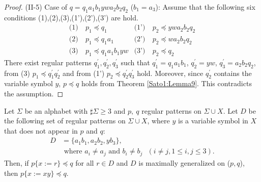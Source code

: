 \begin{proof}
\noindent
(II-5) Case of $q=q_{1}a_{1}b_{1}ywa_{2}b_{2}q_{2}$ ($b_{1}=a_{3}$):
Assume that the following six conditions (1),(2),(3),(1'),(2'),(3') are hold.
\begin{align*}
\textrm{(1)}~& p_{1} \preceq q_{1} & \textrm{(1')}~& p_{2} \preceq ywa_{2}b_{2}q_{2} \\
\textrm{(2)}~& p_{1} \preceq q_{1}a_{1} & \textrm{(2')}~& p_{2} \preceq wa_{2}b_{2}q_{2} \\
\textrm{(3)}~& p_{1} \preceq q_{1}a_{1}b_{1}yw & \textrm{(3')}~& p_{2} \preceq q_{2}
\end{align*}
\noindent
There exist regular patterns $q_{1}^{\prime}, q_{2}^{\prime}, q_{3}^{\prime}$ such that $q_{1}^{\prime}=q_{1}a_{1}b_{1}$, $q_{2}^{\prime}=yw$, $q_{3}^{\prime}=a_{2}b_{2}q_{2}$, from (3) $p_{1} \preceq q_{1}^{\prime}q_{2}^{\prime}$ and from (1') $p_{2} \preceq q_{2}^{\prime}q_{3}^{\prime}$ hold.
Moreover, since $q_{2}^{\prime}$ contains the variable symbol $y$, $p\preceq q$ holds from Theorem \ref{Sato1:Lemma9}.
This contradicts the assumption.
\end{proof}


\begin{lem}\label{lem:3consts_ii}
  Let $\Sigma$ be an alphabet with $\sharp\Sigma \ge 3$ and $p,~q$ regular patterns on $\Sigma\cup X$.
  Let $D$ be the following set of regular patterns on $\Sigma\cup X$, where $y$ is a variable symbol in $X$ that does not appear in $p$ and $q$:
  \begin{align*}
  D & = \{ a_{1}b_{1}, a_{2}b_{2}, yb_{3}\},\\
  & \mbox{ where } a_{i} \ne a_{j} \mbox{ and } b_{i} \ne b_{j} \mbox{ } (i\ne j, 1\le i,j\le 3).
  \end{align*}
  Then, if $p \{ x := r \} \preceq q$ for all $r \in D$ and $D$ is maximally generalized on ($p,q$), then $p \{ x := xy \} \preceq q$.
\end{lem}

